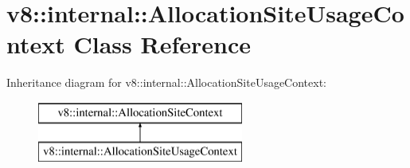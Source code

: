 \hypertarget{classv8_1_1internal_1_1_allocation_site_usage_context}{}\section{v8\+:\+:internal\+:\+:Allocation\+Site\+Usage\+Context Class Reference}
\label{classv8_1_1internal_1_1_allocation_site_usage_context}
Inheritance diagram for v8\+:\+:internal\+:\+:Allocation\+Site\+Usage\+Context\+:\begin{figure}[H]
\begin{center}
\leavevmode
\includegraphics[height=2.000000cm]{classv8_1_1internal_1_1_allocation_site_usage_context}
\end{center}
\end{figure}

